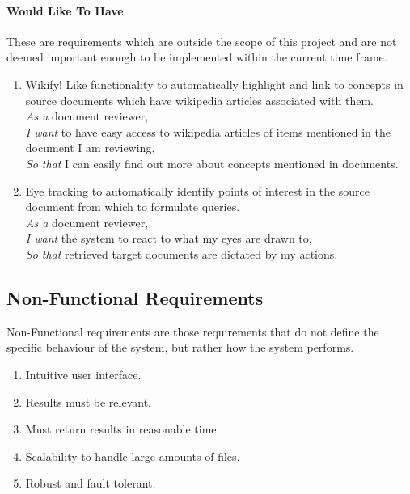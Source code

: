 \documentclass{l4proj}
\begin{document}
\paragraph{Would Like To Have}
These are requirements which are outside the scope of this project and are not deemed important enough to be implemented within the current time frame.
\begin{enumerate}[label=\textbf{W.\arabic*}]
\item Wikify! Like functionality to automatically highlight and link to concepts in source documents which have wikipedia articles associated with them. \\
\textit{As a} document reviewer, \\
\textit{I want} to have easy access to wikipedia articles of items mentioned in the document I am reviewing, \\
\textit{So that} I can easily find out more about concepts mentioned in documents.
\item Eye tracking to automatically identify points of interest in the source document from which to formulate queries. \\
\textit{As a} document reviewer, \\
\textit{I want} the system to react to what my eyes are drawn to, \\
\textit{So that} retrieved target documents are dictated by my actions.
\end{enumerate}
\subsection{Non-Functional Requirements}
Non-Functional requirements are those requirements that do not define the specific behaviour of the system, but rather how the system performs.
\begin{enumerate}[label=\textbf{NF.\arabic*}]
\item Intuitive user interface.
\item Results must be relevant.
\item Must return results in reasonable time.
\item Scalability to handle large amounts of files.
\item Robust and fault tolerant.
\end{enumerate}
\end{document}
